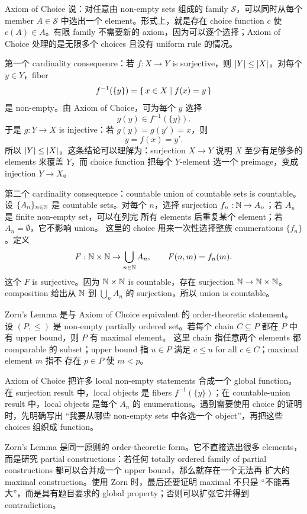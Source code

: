 \begin{solution}
Axiom of Choice 说：对任意由 non-empty sets 组成的 family
\(\mathcal S\)，可以同时从每个 member \(A\in\mathcal S\) 中选出一个
element。形式上，就是存在 choice function \(c\) 使
\(c(A)\in A\)。有限 family 不需要新的 axiom，因为可以逐个选择；Axiom of
Choice 处理的是无限多个 choices 且没有 uniform rule 的情况。

第一个 cardinality consequence：若 \(f:X\to Y\) is surjective，则
\(\left|Y\right|\le\left|X\right|\)。对每个 \(y\in Y\)，fiber
\[
  f^{-1}(\{y\})=\left\{\,x\in X\mid f(x)=y\,\right\}
\]
是 non-empty。由 Axiom of Choice，可为每个 \(y\) 选择
\[
  g(y)\in f^{-1}(\{y\}).
\]
于是 \(g:Y\to X\) is injective：若 \(g(y)=g(y')=x\)，则
\[
  y=f(x)=y'.
\]
所以 \(\left|Y\right|\le\left|X\right|\)。这条结论可以理解为：surjection
\(X\to Y\) 说明 \(X\) 至少有足够多的 elements 来覆盖 \(Y\)，而 choice
function 把每个 \(Y\)-element 选一个 preimage，变成 injection \(Y\to X\)。

第二个 cardinality consequence：countable union of countable sets is
countable。设 \(\{A_n\}_{n\in\mathbb{N}}\) 是 countable sets。对每个 \(n\)，选择
surjection \(f_n:\mathbb{N}\to A_n\)；若 \(A_n\) 是 finite non-empty set，可以在列完
所有 elements 后重复某个 element；若 \(A_n=\emptyset\)，它不影响 union。
这里的 choice 用来一次性选择整族 enumerations \(\{f_n\}\)。定义
\[
  F:\mathbb{N}\times\mathbb{N}\to\bigcup_{n\in\mathbb{N}}A_n,\qquad F(n,m)=f_n(m).
\]
这个 \(F\) is surjective。因为 \(\mathbb{N}\times\mathbb{N}\) is countable，存在
surjection \(\mathbb{N}\to\mathbb{N}\times\mathbb{N}\)。composition 给出从 \(\mathbb{N}\) 到
\(\bigcup_n A_n\) 的 surjection，所以 union is countable。

Zorn's Lemma 是与 Axiom of Choice equivalent 的 order-theoretic statement。
设 \((P,\le)\) 是 non-empty partially ordered set。若每个 chain
\(C\subseteq P\) 都在 \(P\) 中有 upper bound，则 \(P\) 有 maximal element。
这里 chain 指任意两个 elements 都 comparable 的 subset；upper bound 指
\(u\in P\) 满足 \(c\le u\) for all \(c\in C\)；maximal element \(m\) 指不
存在 \(p\in P\) 使 \(m<p\)。
\end{solution}

\begin{explanation}
Axiom of Choice 把许多 local non-empty statements 合成一个 global function。
在 surjection result 中，local objects 是 fibers
\(f^{-1}(\{y\})\)；在 countable-union result 中，local objects 是每个
\(A_n\) 的 enumerations。遇到需要使用 choice 的证明时，先明确写出
``我要从哪些 non-empty sets 中各选一个 object''，再把这些 choices 组织成
function。

Zorn's Lemma 是同一原则的 order-theoretic form。它不直接选出很多
elements，而是研究 partial constructions：若任何 totally ordered family of
partial constructions 都可以合并成一个 upper bound，那么就存在一个无法再
扩大的 maximal construction。使用 Zorn 时，最后还要证明 maximal 不只是
``不能再大''，而是具有题目要求的 global property；否则可以扩张它并得到
contradiction。
\end{explanation}

